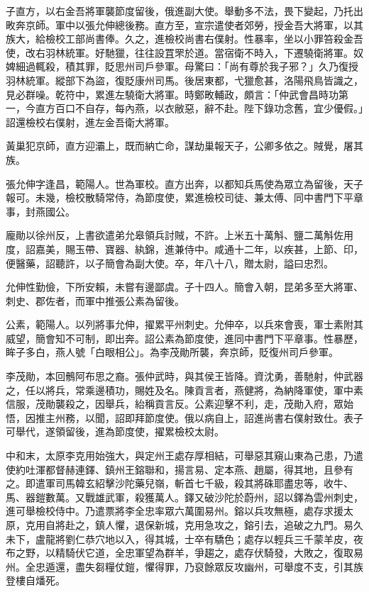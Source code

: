 \begin{pinyinscope}
 子直方，以右金吾將軍襲節度留後，俄進副大使。舉動多不法，畏下變起，乃托出畋奔京師。軍中以張允伸總後務。直方至，宣宗遣使者郊勞，授金吾大將軍，以其族大，給檢校工部尚書俸。久之，進檢校尚書右僕射。性暴率，坐以小罪笞殺金吾使，改右羽林統軍。好馳獵，往往設罝罘於道。當宿衛不時入，下遷驍衛將軍。奴婢細過輒殺，積其罪，貶思州司戶參軍。母驚曰：「尚有尊於我子邪？」久乃復授羽林統軍。縱部下為盜，復貶康州司馬。後居東都，弋獵愈甚，洛陽飛鳥皆識之，見必群噪。乾符中，累進左驍衛大將軍。時鄭畋輔政，頗言：「仲武會昌時功第一，今直方百口不自存，每內燕，以衣敝惡，辭不赴。陛下錄功念舊，宜少優假。」詔還檢校右僕射，進左金吾衛大將軍。



 黃巢犯京師，直方迎灞上，既而納亡命，謀劫巢報天子，公卿多依之。賊覺，屠其族。



 張允伸字逢昌，範陽人。世為軍校。直方出奔，以都知兵馬使為眾立為留後，天子報可。未幾，檢校散騎常侍，為節度使，累進檢校司徒、兼太傅、同中書門下平章事，封燕國公。



 龐勛以徐州反，上書欲遣弟允皋領兵討賊，不許。上米五十萬斛、鹽二萬斛佐用度，詔嘉美，賜玉帶、寶器、紈錦，進兼侍中。咸通十二年，以疾甚，上節、印，便醫藥，詔聽許，以子簡會為副大使。卒，年八十八，贈太尉，謚曰忠烈。



 允伸性勤儉，下所安賴，未嘗有邊鄙虞。子十四人。簡會入朝，昆弟多至大將軍、刺史、郡佐者，而軍中推張公素為留後。



 公素，範陽人。以列將事允伸，擢累平州刺史。允伸卒，以兵來會喪，軍士素附其威望，簡會知不可制，即出奔。詔公素為節度使，進同中書門下平章事。性暴歷，眸子多白，燕人號「白眼相公」。為李茂勛所襲，奔京師，貶復州司戶參軍。



 李茂勛，本回鶻阿布思之裔。張仲武時，與其侯王皆降。資沈勇，善馳射，仲武器之，任以將兵，常乘邊積功，賜姓及名。陳貢言者，燕健將，為納降軍使，軍中素信服，茂勛襲殺之，因舉兵，紿稱貢言反。公素迎擊不利，走，茂勛入府，眾始悟，因推主州務，以聞，詔即拜節度使。俄以病自上，詔進尚書右僕射致仕。表子可舉代，遂領留後，進為節度使，擢累檢校太尉。



 中和末，太原李克用始強大，與定州王處存厚相結，可舉惡其窺山東為己患，乃遣使約吐渾都督赫連鐸、鎮州王鎔聯和，揚言易、定本燕、趙屬，得其地，且參有之。即遣軍司馬韓玄紹擊沙陀藥兒嶺，斬首七千級，殺其將硃耶盡忠等，收牛、馬、器鎧數萬。又戰雄武軍，殺獲萬人。鐸又破沙陀於蔚州，詔以鐸為雲州刺史，進可舉檢校侍中。乃遣票將李全忠率眾六萬圍易州。鎔以兵攻無極，處存求援太原，克用自將赴之，鎮人懼，退保新城，克用急攻之，鎔引去，追破之九門。易久未下，盧龍將劉仁恭穴地以入，得其城，士卒有驕色；處存以輕兵三千蒙羊皮，夜布之野，以精騎伏它道，全忠軍望為群羊，爭趨之，處存伏騎發，大敗之，復取易州。全忠遁還，盡失芻糧仗鎧，懼得罪，乃裒餘眾反攻幽州，可舉度不支，引其族登樓自燔死。




\end{pinyinscope}
